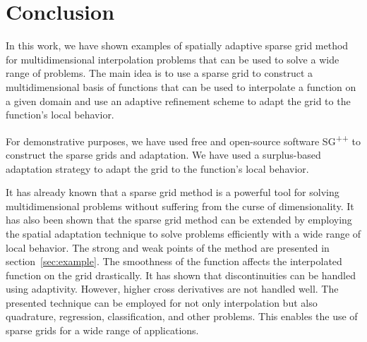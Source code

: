 \section{Conclusion}\label{sec:conclusion}

In this work, we have shown examples of spatially adaptive sparse grid method for multidimensional interpolation problems that can be used to solve a wide range of problems.
The main idea is to use a sparse grid to construct a multidimensional basis of functions that can be used to interpolate a function on a given domain and use an adaptive refinement scheme to adapt the grid to the function's
local behavior.

For demonstrative purposes, we have used free and open-source software SG\textsuperscript{++} to construct the sparse grids and adaptation.
We have used a surplus-based adaptation strategy to adapt the grid to the function's local behavior.

It has already known that a sparse grid method is a powerful tool for solving multidimensional problems without suffering from the curse of dimensionality.
It has also been shown that the sparse grid method can be extended by employing the spatial adaptation technique to solve problems efficiently with a wide range of local behavior.
The strong and weak points of the method are presented in section~\ref{sec:example}. The smoothness of the function affects the interpolated function on the grid drastically. It has shown that discontinuities can be handled using adaptivity. However, higher cross derivatives are not handled well.
The presented technique can be employed for not only interpolation but also quadrature, regression, classification, and other problems. This enables the use of sparse grids for a wide range of applications.

